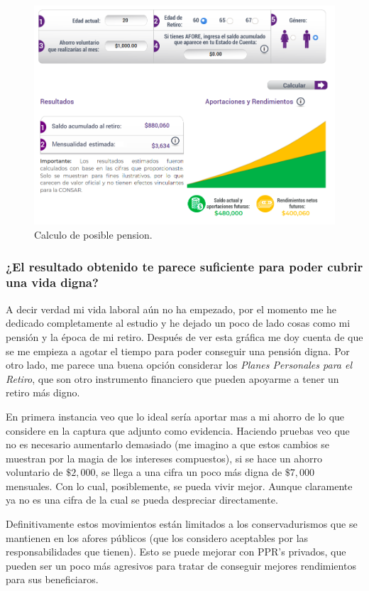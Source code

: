 \documentclass[11pt]{article}
\title{\titulo}
\author{ Universidad Virtual del Estado de Guanajuato \textbf{UVEG} \\ 
\materia \\ Benjamín Rivera \\ 19015478 }
\date{\textit{Fecha de entrega:} \today}
\begin{document}
	\maketitle
	
	\begin{figure}[htp]
		\centering
		\includegraphics[width=\textwidth]{assets/R3_U1-aprox_afore.png}
		\caption{Calculo de posible pension.}
		\label{}
	\end{figure}
	
	\subsubsection*{¿El resultado obtenido te parece suficiente para poder cubrir una  vida  digna?}
	
	\par A decir verdad mi vida laboral aún no ha empezado, por el momento me he dedicado completamente al estudio y he dejado un poco de lado cosas como mi pensión y la época de mi retiro. Después de ver esta gráfica me doy cuenta de que se me empieza a agotar el tiempo para poder conseguir una pensión digna. Por otro lado, me parece una buena opción considerar los \textit{Planes Personales para el Retiro}, que son otro instrumento financiero que pueden apoyarme a tener un retiro más digno.
	\par En primera instancia veo que lo ideal sería aportar mas a mi ahorro de lo que considere en la captura que adjunto como evidencia. Haciendo pruebas veo que no es necesario aumentarlo demasiado (me imagino a que estos cambios se muestran por la magia de los intereses compuestos), si se hace un ahorro voluntario de $\$2,000$, se llega a una cifra un poco más digna de $\$7,000$ mensuales. Con lo cual, posiblemente, se pueda vivir mejor. Aunque claramente ya no es una cifra de la cual se pueda despreciar directamente.
	\par Definitivamente estos movimientos están limitados a los conservadurismos que se mantienen en los afores públicos (que los considero aceptables por las responsabilidades que tienen). Esto se puede mejorar con PPR's privados, que pueden ser un poco más agresivos para tratar de conseguir mejores rendimientos para sus beneficiaros.
	
\end{document}
